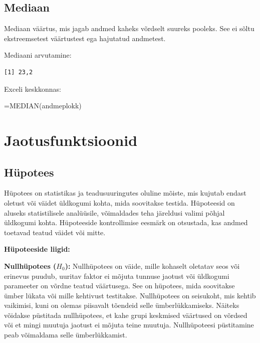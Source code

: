 \documentclass[
]{book}
\newenvironment{Shaded}{\begin{snugshade}}{\end{snugshade}}
\newcommand{\FunctionTok}[1]{\textcolor[rgb]{0.13,0.29,0.53}{\textbf{#1}}}
\newcommand{\NormalTok}[1]{#1}
\newcommand{\SpecialCharTok}[1]{\textcolor[rgb]{0.81,0.36,0.00}{\textbf{#1}}}
\renewenvironment{Shaded} {\begin{snugshade}\footnotesize} {\end{snugshade}}
\begin{document}
\section{Mediaan}\label{mediaan}

Mediaan väärtus, mis jagab andmed kaheks võrdselt suureks pooleks. See ei sõltu ekstreemsetest väärtustest ega hajutatud andmetest.

Mediaani arvutamine:

\begin{Shaded}
\end{Shaded}

\begin{verbatim}
[1] 23,2
\end{verbatim}

Exceli keskkonnas:

\begin{naideExcel}
=MEDIAN(andmeplokk)

\end{naideExcel}

\chapter{Jaotusfunktsioonid}\label{jaotusfunktsioonid}

\section{Hüpotees}\label{huxfcpotees}

Hüpotees on statistikas ja teadusuuringutes oluline mõiste, mis kujutab endast oletust või väidet üldkogumi kohta, mida soovitakse testida. Hüpoteesid on aluseks statistilisele analüüsile, võimaldades teha järeldusi valimi põhjal üldkogumi kohta. Hüpoteeside kontrollimise eesmärk on otsustada, kas andmed toetavad teatud väidet või mitte.

\textbf{Hüpoteeside liigid:}

\textbf{Nullhüpotees (\(H_0\)):} Nullhüpotees on väide, mille kohaselt oletatav seos või erinevus puudub, uuritav faktor ei mõjuta tunnuse jaotust või üldkogumi parameeter on võrdne teatud väärtusega. See on hüpotees, mida soovitakse ümber lükata või mille kehtivust testitakse. Nullhüpotees on seisukoht, mis kehtib vaikimisi, kuni on olemas piisavalt tõendeid selle ümberlükkamiseks. Näiteks võidakse püstitada nullhüpotees, et kahe grupi keskmised väärtused on võrdsed või et mingi muutuja jaotust ei mõjuta teine muutuja. Nullhüpoteesi püstitamine peab võimaldama selle ümberlükkamist.
\end{document}

